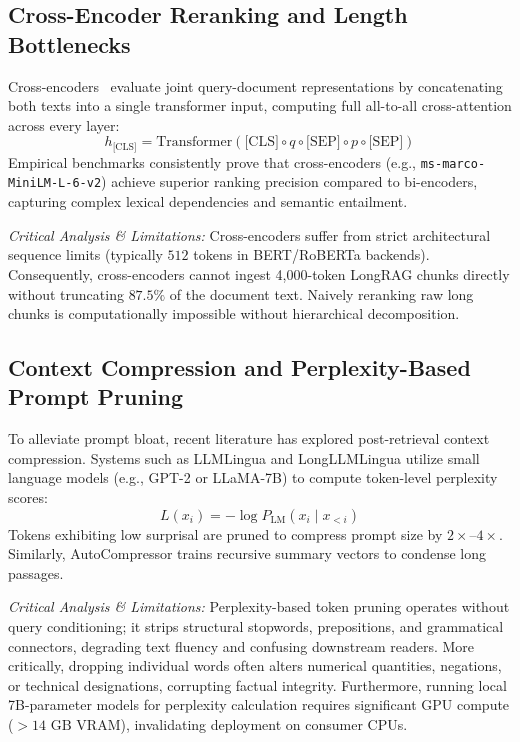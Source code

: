 \documentclass[lettersize,journal]{IEEEtran}
\begin{document}
\subsection{Cross-Encoder Reranking and Length Bottlenecks}
Cross-encoders~\cite{crossencoder} evaluate joint query-document representations by concatenating both texts into a single transformer input, computing full all-to-all cross-attention across every layer:
\begin{equation}
\label{eq:crossencoder}
h_{\text{[CLS]}} = \text{Transformer}(\text{[CLS]} \circ q \circ \text{[SEP]} \circ p \circ \text{[SEP]})
\end{equation}
Empirical benchmarks consistently prove that cross-encoders (e.g., \texttt{ms-marco-MiniLM-L-6-v2}) achieve superior ranking precision compared to bi-encoders, capturing complex lexical dependencies and semantic entailment.

\textit{Critical Analysis \& Limitations:} Cross-encoders suffer from strict architectural sequence limits (typically $512$ tokens in BERT/RoBERTa backends). Consequently, cross-encoders cannot ingest 4,000-token LongRAG chunks directly without truncating $87.5\%$ of the document text. Naively reranking raw long chunks is computationally impossible without hierarchical decomposition.

\subsection{Context Compression and Perplexity-Based Prompt Pruning}
To alleviate prompt bloat, recent literature has explored post-retrieval context compression. Systems such as LLMLingua and LongLLMLingua utilize small language models (e.g., GPT-2 or LLaMA-7B) to compute token-level perplexity scores:
\begin{equation}
\label{eq:perplexity}
L(x_i) = -\log P_{\text{LM}}(x_i \mid x_{<i})
\end{equation}
Tokens exhibiting low surprisal are pruned to compress prompt size by $2\times$--$4\times$. Similarly, AutoCompressor trains recursive summary vectors to condense long passages.

\textit{Critical Analysis \& Limitations:} Perplexity-based token pruning operates without query conditioning; it strips structural stopwords, prepositions, and grammatical connectors, degrading text fluency and confusing downstream readers. More critically, dropping individual words often alters numerical quantities, negations, or technical designations, corrupting factual integrity. Furthermore, running local 7B-parameter models for perplexity calculation requires significant GPU compute ($>14\text{ GB}$ VRAM), invalidating deployment on consumer CPUs.
\end{document}
